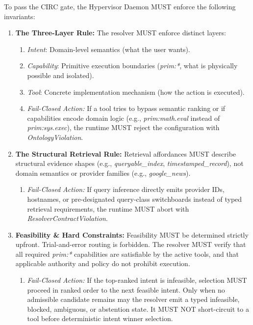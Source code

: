 \documentclass[
  11pt,
]{article}
\providecommand{\tightlist}{%
  \setlength{\itemsep}{0pt}\setlength{\parskip}{0pt}}
\begin{document}
To pass the CIRC gate, the Hypervisor Daemon MUST enforce the following
invariants:

\begin{enumerate}
\def\labelenumi{\arabic{enumi}.}
\item
  \textbf{The Three-Layer Rule:} The resolver MUST enforce distinct
  layers:

  \begin{enumerate}
  \def\labelenumii{\arabic{enumii}.}
  \tightlist
  \item
    \emph{Intent}: Domain-level semantics (what the user wants).
  \item
    \emph{Capability}: Primitive execution boundaries (\emph{prim:*},
    what is physically possible and isolated).
  \item
    \emph{Tool}: Concrete implementation mechanism (how the action is
    executed).
  \item
    \emph{Fail-Closed Action:} If a tool tries to bypass semantic
    ranking or if capabilities encode domain logic (e.g.,
    \emph{prim:math.eval} instead of \emph{prim:sys.exec}), the runtime
    MUST reject the configuration with \emph{OntologyViolation}.
  \end{enumerate}
\item
  \textbf{The Structural Retrieval Rule:} Retrieval affordances MUST
  describe structural evidence shapes (e.g., \emph{queryable\_index},
  \emph{timestamped\_record}), not domain semantics or provider families
  (e.g., \emph{google\_news}).

  \begin{enumerate}
  \def\labelenumii{\arabic{enumii}.}
  \tightlist
  \item
    \emph{Fail-Closed Action:} If query inference directly emits
    provider IDs, hostnames, or pre-designated query-class switchboards
    instead of typed retrieval requirements, the runtime MUST abort with
    \emph{ResolverContractViolation}.
  \end{enumerate}
\item
  \textbf{Feasibility \& Hard Constraints:} Feasibility MUST be
  determined strictly upfront. Trial-and-error routing is forbidden. The
  resolver MUST verify that all required \emph{prim:*} capabilities are
  satisfiable by the active tools, and that applicable authority and policy
  do not prohibit execution.

  \begin{enumerate}
  \def\labelenumii{\arabic{enumii}.}
  \tightlist
  \item
    \emph{Fail-Closed Action:} If the top-ranked intent is infeasible,
    selection MUST proceed in ranked order to the next feasible intent.
    Only when no admissible candidate remains may the resolver emit a typed
    infeasible, blocked, ambiguous, or abstention state. It MUST NOT
    short-circuit to a tool before deterministic intent winner selection.
  \end{enumerate}
\end{enumerate}
\end{document}
